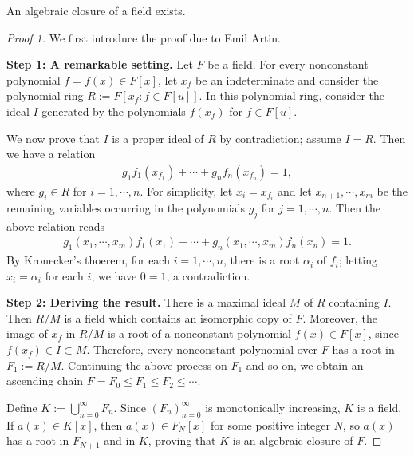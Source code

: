 \begin{thm}
    An algebraic closure of a field exists.
\end{thm}
\begin{proof}[Proof 1]
    We first introduce the proof due to Emil Artin.

    \indent\textbf{Step 1: A remarkable setting.}\newline\noindent
    Let $F$ be a field.
    For every nonconstant polynomial $f=f(x)\in F[x]$, let $x_f$ be an indeterminate and consider the polynomial ring $R:=F[x_f: f\in F[u]]$.
    In this polynomial ring, consider the ideal $I$ generated by the polynomials $f(x_f)$ for $f\in F[u]$.

    We now prove that $I$ is a proper ideal of $R$ by contradiction; assume $I=R$.
    Then we have a relation
    \begin{align*}
        g_1f_1(x_{f_1})+\cdots+g_nf_n(x_{f_n})=1,
    \end{align*}
    where $g_i\in R$ for $i=1, \cdots, n$.
    For simplicity, let $x_i=x_{f_i}$ and let $x_{n+1}, \cdots, x_m$ be the remaining variables occurring in the polynomials $g_j$ for $j=1, \cdots, n$.
    Then the above relation reads
    \begin{align*}
        g_1(x_1, \cdots, x_m)f_1(x_1)+\cdots+g_n(x_1, \cdots, x_m)f_n(x_n)=1.
    \end{align*}
    By Kronecker's thoerem, for each $i=1, \cdots, n$, there is a root $\alpha_i$ of $f_i$; letting $x_i=\alpha_i$ for each $i$, we have $0=1$, a contradiction.

    \textbf{Step 2: Deriving the result.}\newline\noindent
    There is a maximal ideal $M$ of $R$ containing $I$.
    Then $R/M$ is a field which contains an isomorphic copy of $F$.
    Moreover, the image of $x_f$ in $R/M$ is a root of a nonconstant polynomial $f(x)\in F[x]$, since $f(x_f)\in I\subset M$.
    Therefore, every nonconstant polynomial over $F$ has a root in $F_1:=R/M$.
    Continuing the above process on $F_1$ and so on, we obtain an ascending chain $F=F_0\leq F_1\leq F_2\leq \cdots$.

    Define $K:=\bigcup_{n=0}^\infty F_n$.
    Since $(F_n)_{n=0}^\infty$ is monotonically increasing, $K$ is a field.
    If $a(x)\in K[x]$, then $a(x)\in F_N[x]$ for some positive integer $N$, so $a(x)$ has a root in $F_{N+1}$ and in $K$, proving that $K$ is an algebraic closure of $F$.
\end{proof}
